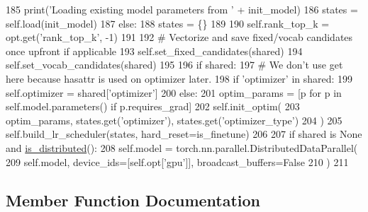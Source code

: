 \begin{DoxyCode}
185                 print(\textcolor{stringliteral}{'Loading existing model parameters from '} + init\_model)
186                 states = self.load(init\_model)
187             \textcolor{keywordflow}{else}:
188                 states = \{\}
189 
190         self.rank\_top\_k = opt.get(\textcolor{stringliteral}{'rank\_top\_k'}, -1)
191 
192         \textcolor{comment}{# Vectorize and save fixed/vocab candidates once upfront if applicable}
193         self.set\_fixed\_candidates(shared)
194         self.set\_vocab\_candidates(shared)
195 
196         \textcolor{keywordflow}{if} shared:
197             \textcolor{comment}{# We don't use get here because hasattr is used on optimizer later.}
198             \textcolor{keywordflow}{if} \textcolor{stringliteral}{'optimizer'} \textcolor{keywordflow}{in} shared:
199                 self.optimizer = shared[\textcolor{stringliteral}{'optimizer'}]
200         \textcolor{keywordflow}{else}:
201             optim\_params = [p \textcolor{keywordflow}{for} p \textcolor{keywordflow}{in} self.model.parameters() \textcolor{keywordflow}{if} p.requires\_grad]
202             self.init\_optim(
203                 optim\_params, states.get(\textcolor{stringliteral}{'optimizer'}), states.get(\textcolor{stringliteral}{'optimizer\_type'})
204             )
205             self.build\_lr\_scheduler(states, hard\_reset=is\_finetune)
206 
207         \textcolor{keywordflow}{if} shared \textcolor{keywordflow}{is} \textcolor{keywordtype}{None} \textcolor{keywordflow}{and} \hyperlink{namespaceparlai_1_1utils_1_1distributed_a023acb5e3b66e1f27e21247c35661279}{is\_distributed}():
208             self.model = torch.nn.parallel.DistributedDataParallel(
209                 self.model, device\_ids=[self.opt[\textcolor{stringliteral}{'gpu'}]], broadcast\_buffers=\textcolor{keyword}{False}
210             )
211 
\end{DoxyCode}


\subsection{Member Function Documentation}
\mbox{\label{classparlai_1_1core_1_1torch__ranker__agent_1_1TorchRankerAgent_a8b16043428bbb29ee4a3ed28c2bbb472}} 
